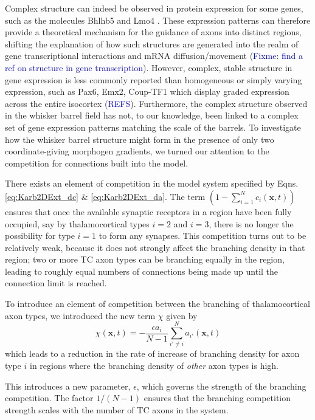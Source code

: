 \documentclass[a4paper,11pt]{article}
\newcommand{\cmnt}[1]{\textcolor{blue}{#1}}
\newcommand{\e}{\emph}
\newcommand{\mb}[1]{\mathbf{#1}}
\begin{document}
Complex structure can indeed be observed in protein expression for some genes,
such as the molecules Bhlhb5 \citep{Joshi2008} and Lmo4
\citep{Cederquist2013,Greig2013}. These expression patterns can therefore
provide a theoretical mechanism for the guidance of axons into distinct
regions, shifting the explanation of how such structures are generated into
the realm of gene transcriptional interactions and mRNA diffusion/movement
(\cmnt{Fixme: find a ref on structure in gene transcription}). However,
complex, stable structure in gene expression is less commonly reported than
homogeneous or simply varying expression, such as Pax6, Emx2, Coup-TF1 which
display graded expression across the entire isocortex
(\cmnt{REFS}). Furthermore, the complex structure observed in the whisker
barrel field has not, to our knowledge, been linked to a complex set of gene
expression patterns matching the scale of the barrels. To investigate how the
whisker barrel structure might form in the presence of only two
coordinate-giving morphogen gradients, we turned our attention to the
competition for connections built into the model.

There exists an element of competition in the model system specified by
Eqns. \ref{eq:Karb2DExt_dc} \& \ref{eq:Karb2DExt_da}. The term $\left(1 -
\sum_{i=1}^{N} c_i(\mb{x}, t)\right)$ ensures that once the available synaptic
receptors in a region have been fully occupied, say by thalamocortical types
$i=2$ and $i=3$, there is no longer the possibility for type $i=1$ to form any
synapses. This competition turns out to be relatively weak, because it does
not strongly affect the branching density in that region; two or more TC axon
types can be branching equally in the region, leading to roughly equal numbers
of connections being made up until the connection limit is reached.

To introduce an element of competition between the branching of
thalamocortical axon types, we introduced the new term $\chi$ given by
%
\begin{equation} \label{eq:branch_comp}
\chi(\mb{x}, t) = - \frac{\epsilon  a_i}{N-1} \sum_{i' \ne i}^{N} a_{i'}(\mb{x}, t)
\end{equation}
%
which leads to a reduction in the rate of increase of branching density for
axon type $i$ in regions where the branching density of \e{other} axon
types is high.

This introduces a new parameter, $\epsilon$, which governs the
strength of the branching competition. The factor $1/(N-1)$ ensures that the
branching competition strength scales with the number of TC axons in the
system.
\end{document}
